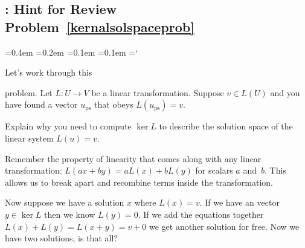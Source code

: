 
\subsection*{\leastSquaresTitle: Hint for Review Problem~\ref{kernalsolspaceprob}}

{\ttfamily
{}\font=0.4em
\font=0.2em
\font=0.1em
\font=0.1em
\hyphenchar\font=`\-


\hypertarget{scripts_least_squares_hint}{Let's work through this} problem. 
 Let $L:U\rightarrow V$ be a linear transformation.  Suppose $v\in L(U)$ and you have found a vector $u_{\mathrm{ps}}$ that obeys $L(u_{\mathrm{ps}})=v$.

Explain why you need to compute $\ker L$ to describe the solution space of the linear system $L(u)=v$.

Remember the property of linearity that comes along with any linear transformation: $L(ax+by) = aL(x) + bL(y)$ for scalars $a$ and~$b$. This allows us to break apart and recombine terms inside the transformation.

Now suppose we have a solution $x$ where $L(x)=v$. If we have an vector $y \in \ker{L}$ then we know $L(y)=0$. If we add the equations together $L(x)+  L(y) = L(x+ y)=v +0$ we get another solution for free. Now we have two solutions, is that all?



} %

